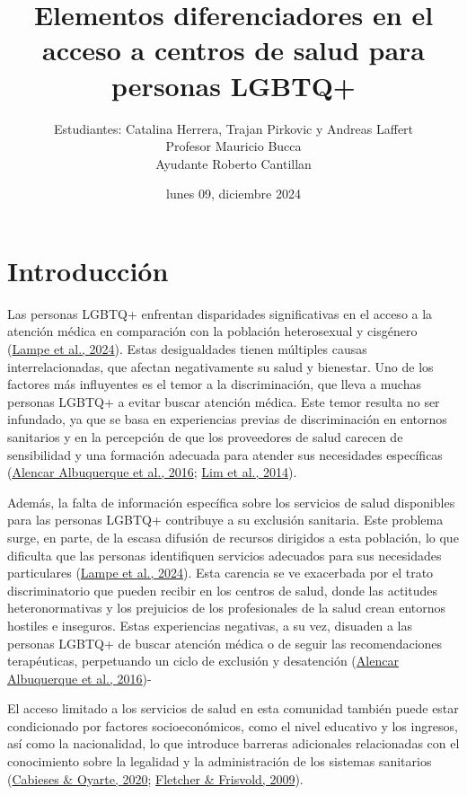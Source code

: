 \documentclass[
  12pt,
  a4paper,
]{article}
\title{\vspace{3cm} Elementos diferenciadores en el acceso a centros de salud para personas LGBTQ+}
\subtitle{\vspace{2cm}

Análisis de Datos Categóricos - SOL3070}
\author{Estudiantes: Catalina Herrera, Trajan Pirkovic y Andreas Laffert\\
Profesor Mauricio Bucca\\
Ayudante Roberto Cantillan\\
\vspace{6cm}}
\date{lunes 09, diciembre 2024}
\begin{document}
\maketitle

\pagebreak

\hypertarget{introducciuxf3n}{%
\section{Introducción}\label{introducciuxf3n}}

Las personas LGBTQ+ enfrentan disparidades significativas en el acceso a la atención médica en comparación con la población heterosexual y cisgénero (\protect\hyperlink{ref-lampe2024health}{Lampe et al., 2024}). Estas desigualdades tienen múltiples causas interrelacionadas, que afectan negativamente su salud y bienestar. Uno de los factores más influyentes es el temor a la discriminación, que lleva a muchas personas LGBTQ+ a evitar buscar atención médica. Este temor resulta no ser infundado, ya que se basa en experiencias previas de discriminación en entornos sanitarios y en la percepción de que los proveedores de salud carecen de sensibilidad y una formación adecuada para atender sus necesidades específicas (\protect\hyperlink{ref-alencar2016access}{Alencar Albuquerque et al., 2016}; \protect\hyperlink{ref-lim2014addressing}{Lim et al., 2014}).

Además, la falta de información específica sobre los servicios de salud disponibles para las personas LGBTQ+ contribuye a su exclusión sanitaria. Este problema surge, en parte, de la escasa difusión de recursos dirigidos a esta población, lo que dificulta que las personas identifiquen servicios adecuados para sus necesidades particulares (\protect\hyperlink{ref-lampe2024health}{Lampe et al., 2024}). Esta carencia se ve exacerbada por el trato discriminatorio que pueden recibir en los centros de salud, donde las actitudes heteronormativas y los prejuicios de los profesionales de la salud crean entornos hostiles e inseguros. Estas experiencias negativas, a su vez, disuaden a las personas LGBTQ+ de buscar atención médica o de seguir las recomendaciones terapéuticas, perpetuando un ciclo de exclusión y desatención (\protect\hyperlink{ref-alencar2016access}{Alencar Albuquerque et al., 2016})-

El acceso limitado a los servicios de salud en esta comunidad también puede estar condicionado por factores socioeconómicos, como el nivel educativo y los ingresos, así como la nacionalidad, lo que introduce barreras adicionales relacionadas con el conocimiento sobre la legalidad y la administración de los sistemas sanitarios (\protect\hyperlink{ref-cabieses2020health}{Cabieses \& Oyarte, 2020}; \protect\hyperlink{ref-fletcher2009higher}{Fletcher \& Frisvold, 2009}).
\end{document}
